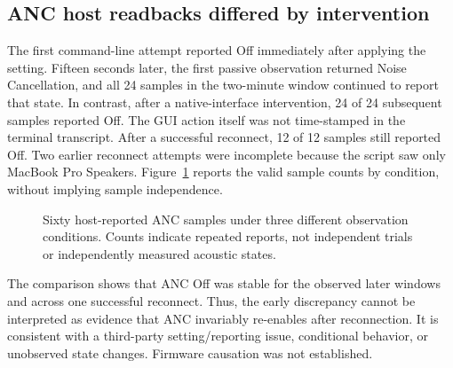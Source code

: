 \documentclass[11pt,letterpaper]{article}
\begin{document}
\subsection{ANC host readbacks differed by intervention}
The first command-line attempt reported Off immediately after applying the setting. Fifteen seconds later, the first passive observation returned Noise Cancellation, and all 24 samples in the two-minute window continued to report that state. In contrast, after a native-interface intervention, 24 of 24 subsequent samples reported Off. The GUI action itself was not time-stamped in the terminal transcript. After a successful reconnect, 12 of 12 samples still reported Off. Two earlier reconnect attempts were incomplete because the script saw only MacBook Pro Speakers. Figure~\ref{fig:anc} reports the valid sample counts by condition, without implying sample independence.

\begin{figure}[htbp]\centering
{}
\caption{Sixty host-reported ANC samples under three different observation conditions. Counts indicate repeated reports, not independent trials or independently measured acoustic states.}\label{fig:anc}
\end{figure}

The comparison shows that ANC Off was stable for the observed later windows and across one successful reconnect. Thus, the early discrepancy cannot be interpreted as evidence that ANC invariably re-enables after reconnection. It is consistent with a third-party setting/reporting issue, conditional behavior, or unobserved state changes. Firmware causation was not established.
\end{document}
